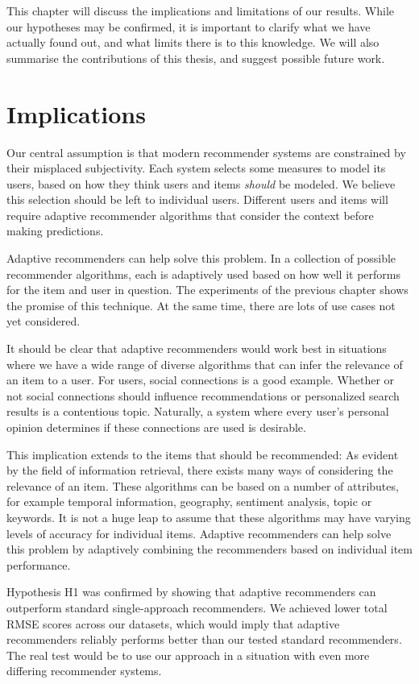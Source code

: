 \label{chap:discussion}

This chapter will discuss the implications and limitations of our results.
While our hypotheses may be confirmed,
it is important to clarify what we have actually found out,
and what limits there is to this knowledge.
We will also summarise the contributions of this thesis,
and suggest possible future work.


\section{Implications}      

Our central assumption is that modern recommender systems 
are constrained by their misplaced subjectivity.
Each system selects some measures to model its users, 
based on how they think users and items \emph{should} be modeled.
We believe this selection should be left to individual users.
Different users and items will require adaptive recommender algorithms that
consider the context before making predictions.

Adaptive recommenders can help solve this problem.
In a collection of possible recommender algorithms, each is adaptively used based 
on how well it performs for the item and user in question.
The experiments of the previous chapter shows the promise of this technique.
At the same time, there are lots of use cases not yet considered.

It should be clear that adaptive recommenders would work best in situations where
we have a wide range of diverse algorithms that can infer the relevance of an item to a user.
For users, social connections is a good example. Whether or not social connections should influence
recommendations or personalized search results is a contentious topic.
Naturally, a system where every user's personal opinion determines if these connections are used is desirable.

This implication extends to the items that should be recommended:
As evident by the field of information retrieval,
there exists many ways of considering the relevance of an item. 
These algorithms can be based on a number of attributes, for example
temporal information, geography, sentiment analysis, topic or keywords.
It is not a huge leap to assume that these algorithms may have
varying levels of accuracy for individual items.
Adaptive recommenders can help solve this problem by adaptively 
combining the recommenders based on individual item performance.

Hypothesis H1 was confirmed by showing that adaptive recommenders
can outperform standard single-approach recommenders.
We achieved lower total RMSE scores across our datasets,
which would imply that adaptive recommenders
reliably performs better than our tested standard recommenders.
The real test would be to use our approach
in a situation with even more differing recommender systems.


